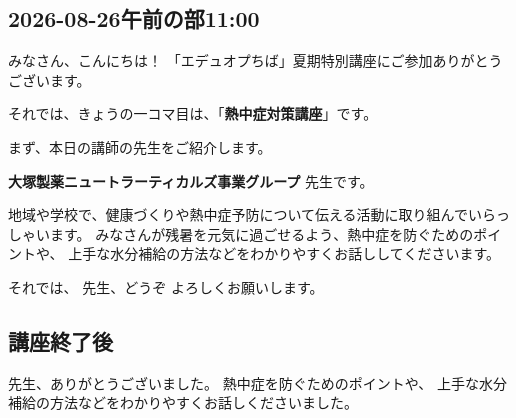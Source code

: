 \documentclass[12pt, jafontscale=0.9247]{jlreq}
\begin{document}
%
%
\subsection*{2026-08-26午前の部11:00}
みなさん、こんにちは！ 「エデュオプちば」夏期特別講座にご参加ありがとうございます。

\bigskip

それでは、きょうの一コマ目は、「{\gtfamily\bfseries 熱中症対策講座}」です。

まず、本日の講師の先生をご紹介します。

{\gtfamily\bfseries 大塚製薬ニュートラーティカルズ事業グループ }
先生です。

地域や学校で、健康づくりや熱中症予防について伝える活動に取り組んでいらっしゃいます。
みなさんが残暑を元気に過ごせるよう、熱中症を防ぐためのポイントや、
上手な水分補給の方法などをわかりやすくお話ししてくださいます。

それでは、{\gtfamily\bfseries {}} 先生、どうぞ
よろしくお願いします。

\vspace{20pt}

\subsection*{講座終了後}
{\gtfamily\bfseries {}} 先生、ありがとうございました。
熱中症を防ぐためのポイントや、 上手な水分補給の方法などをわかりやすくお話しくださいました。
\end{document}
